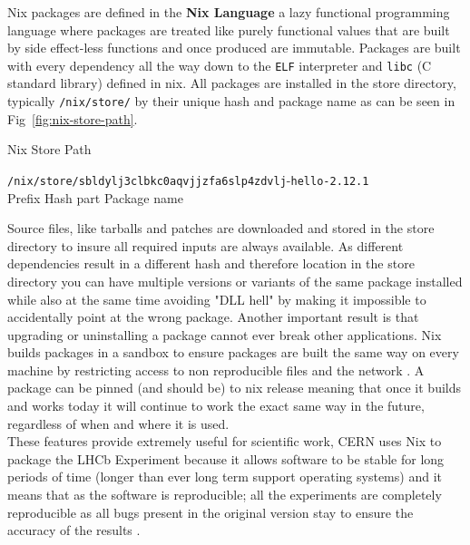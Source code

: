 Nix packages are defined in the \textbf{Nix Language} a lazy functional programming language where packages are treated like purely functional values that are built by side effect-less functions and once produced are immutable. Packages are built with every dependency all the way down to the \texttt{ELF} interpreter and \texttt{libc} (C standard library) defined in nix. All packages are installed in the store directory, typically \texttt{/nix/store/} by their unique hash and package name as can be seen in Fig~\ref{fig:nix-store-path}.

\begin{figureBox}[label={fig:nix-store-path}]{Nix Store Path}
  \begin{tabbing}
    \={\color{Purple}\texttt{/nix/store/}}\={\color{RoyalBlue}\texttt{sbldylj3clbkc0aqvjjzfa6slp4zdvlj}}-\={\color{Orange}\texttt{hello-2.12.1}} \\
    \>\small{Prefix} \>\small {Hash part} \>\small {Package name}
  \end{tabbing}
\end{figureBox}

Source files, like tarballs and patches are downloaded and stored in the store directory to insure all required inputs are always available. As different dependencies result in a different hash and therefore location in the store directory you can have multiple versions or variants of the same package installed while also at the same time avoiding "DLL hell" by making it impossible to accidentally point at the wrong package. Another important result is that upgrading or uninstalling a package cannot ever break other applications. Nix builds packages in a sandbox to ensure packages are built the same way on every machine by restricting access to non reproducible files and the network \cite{nixcon-sandboxs}. A package can be pinned (and should be) to nix release meaning that once it builds and works today it will continue to work the exact same way in the future, regardless of when and where it is used. \\


These features provide extremely useful for scientific work, CERN uses Nix to package the LHCb Experiment because it allows software to be stable for long periods of time (longer than ever long term support operating systems) and it means that as the software is reproducible; all the experiments are completely reproducible as all bugs present in the original version stay to ensure the accuracy of the results \cite{LHCbNix}. \\


